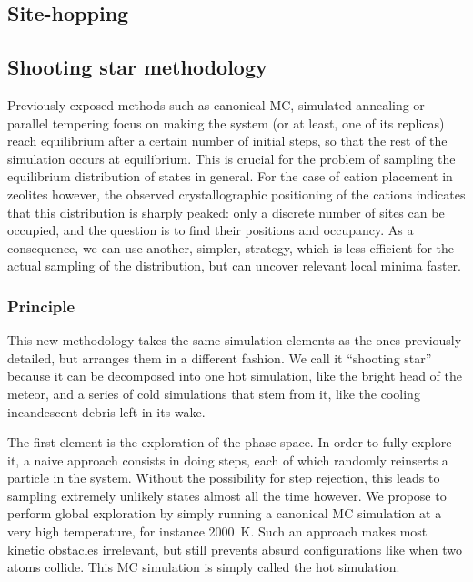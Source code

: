 \documentclass[main.tex]{subfiles}
\begin{document}
\subsection{Site-hopping}

\label{sitehopping}


\subsection{Shooting star methodology}

Previously exposed methods such as canonical MC, simulated annealing or parallel tempering focus on making the system (or at least, one of its replicas) reach equilibrium after a certain number of initial steps, so that the rest of the simulation occurs at equilibrium. This is crucial for the problem of sampling the equilibrium distribution of states in general. For the case of cation placement in zeolites however, the observed crystallographic positioning of the cations indicates that this distribution is sharply peaked: only a discrete number of sites can be occupied, and the question is to find their positions and occupancy. As a consequence, we can use another, simpler, strategy, which is less efficient for the actual sampling of the distribution, but can uncover relevant local minima faster.

\subsubsection{Principle}

This new methodology takes the same simulation elements as the ones previously detailed, but arranges them in a different fashion. We call it ``shooting star'' because it can be decomposed into one hot simulation, like the bright head of the meteor, and a series of cold simulations that stem from it, like the cooling incandescent debris left in its wake.

The first element is the exploration of the phase space. In order to fully explore it, a naive approach consists in doing steps, each of which randomly reinserts a particle in the system. Without the possibility for step rejection, this leads to sampling extremely unlikely states almost all the time however. We propose to perform global exploration by simply running a canonical MC simulation at a very high temperature, for instance \qty{2000}{K}. Such an approach makes most kinetic obstacles irrelevant, but still prevents absurd configurations like when two atoms collide. This MC simulation is simply called the hot simulation.
\end{document}
